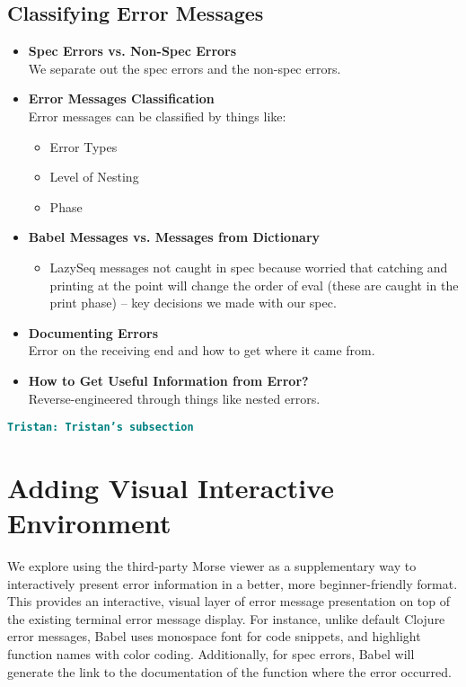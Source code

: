 \documentclass[12pt]{article}
\newcommand{\comment}[1]{{\bf \tt  {#1}}}
\newcommand{\tkcomment}[1]{\textcolor{Teal}{\comment{Tristan: {#1}}}}
\begin{document}
\subsection{Classifying Error Messages}\label{subsec:classification}
\begin{itemize}
    \item \textbf{Spec Errors vs. Non-Spec Errors} \\
    We separate out the spec errors and the non-spec errors.

    \item \textbf{Error Messages Classification} \\
    Error messages can be classified by things like:
    \begin{itemize}
        \item Error Types
        \item Level of Nesting
        \item Phase
    \end{itemize}

    \item \textbf{Babel Messages vs. Messages from Dictionary} \\
    \begin{itemize}
        \item LazySeq messages not caught in spec because worried that catching and printing at the point will change the order of eval (these are caught in the print phase) -- key decisions we made with our spec.
    \end{itemize}

    \item \textbf{Documenting Errors} \\
    Error on the receiving end and how to get where it came from.

    \item \textbf{How to Get Useful Information from Error?} \\
    Reverse-engineered through things like nested errors.

\end{itemize}
\tkcomment{Tristan's subsection}

\section{Adding Visual Interactive Environment}\label{sec:interactive}

We explore using the third-party Morse viewer as a supplementary way to interactively present error information in a better, more beginner-friendly format.
This provides an interactive, visual layer of error message presentation on top of the existing terminal error message display.
For instance, unlike default Clojure error messages, Babel uses monospace font for code snippets, and highlight function names with color coding. 
Additionally, for spec errors, Babel will generate the link to the documentation of the function where the error occurred.
\end{document}

